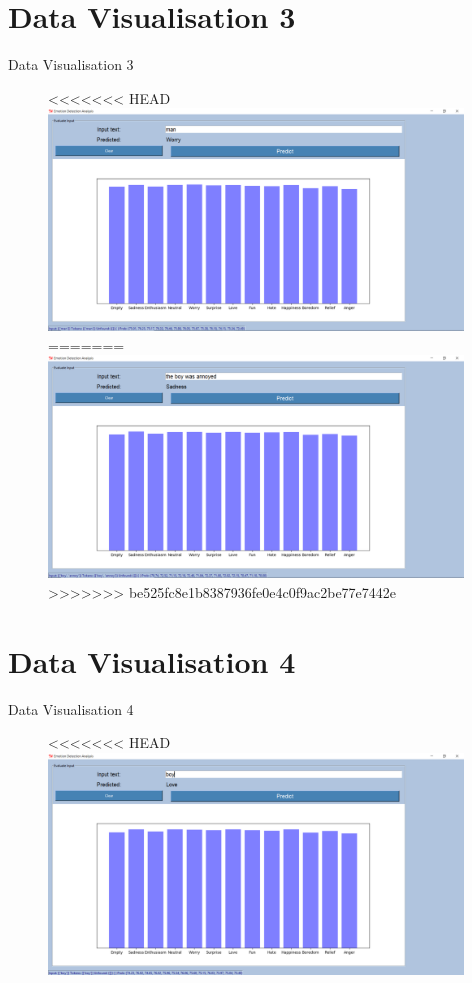\documentclass{beamer}
\begin{document}
\section{Data Visualisation 3}
\begin{frame}{Data Visualisation 3}
\begin{figure}[H]
\centering
<<<<<<< HEAD
\includegraphics[width=110mm]{DV1.png}
=======
\includegraphics[width=110mm]{DV3.png}
>>>>>>> be525fc8e1b8387936fe0e4c0f9ac2be77e7442e
\end{figure}
\end{frame}

\section{Data Visualisation 4}
\begin{frame}{Data Visualisation 4}
\begin{figure}[H]
\centering
<<<<<<< HEAD
\includegraphics[width=110mm]{DV2.png}
\end{figure}
\end{frame}
\end{document}
